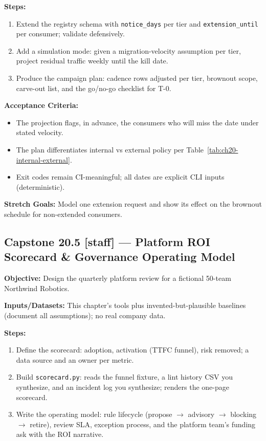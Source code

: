 \textbf{Steps:}
\begin{enumerate}
  \item Extend the registry schema with \texttt{notice\_days} per tier
        and \texttt{extension\_until} per consumer; validate
        defensively.
  \item Add a simulation mode: given a migration-velocity assumption per
        tier, project residual traffic weekly until the kill date.
  \item Produce the campaign plan: cadence rows adjusted per tier,
        brownout scope, carve-out list, and the go/no-go checklist for
        T-0.
\end{enumerate}

\textbf{Acceptance Criteria:}
\begin{itemize}
  \item[$\square$] The projection flags, in advance, the consumers who
        will miss the date under stated velocity.
  \item[$\square$] The plan differentiates internal vs external policy
        per Table~\ref{tab:ch20-internal-external}.
  \item[$\square$] Exit codes remain CI-meaningful; all dates are
        explicit CLI inputs (deterministic).
\end{itemize}

\textbf{Stretch Goals:} Model one extension request and show its effect
on the brownout schedule for non-extended consumers.

\subsection*{Capstone 20.5 [staff] --- Platform ROI Scorecard \& Governance Operating Model}
\textbf{Objective:} Design the quarterly platform review for a fictional
50-team Northwind Robotics.

\textbf{Inputs/Datasets:} This chapter's tools plus invented-but-plausible
baselines (document all assumptions); no real company data.

\textbf{Steps:}
\begin{enumerate}
  \item Define the scorecard: adoption, activation (TTFC funnel), risk
        removed; a data source and an owner per metric.
  \item Build \texttt{scorecard.py}: reads the funnel fixture, a lint
        history CSV you synthesize, and an incident log you synthesize;
        renders the one-page scorecard.
  \item Write the operating model: rule lifecycle (propose $\rightarrow$
        advisory $\rightarrow$ blocking $\rightarrow$ retire), review
        SLA, exception process, and the platform team's funding ask with
        the ROI narrative.
\end{enumerate}

